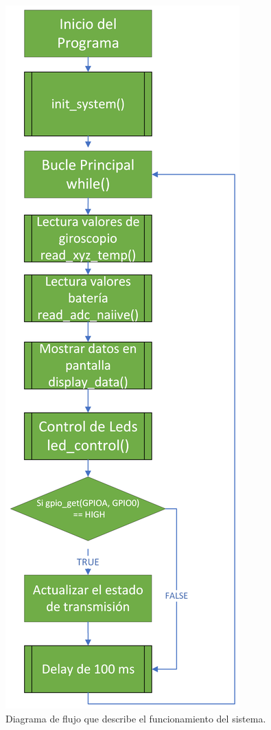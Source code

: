 \begin{figure}[H]
    \centering
        \includegraphics[scale = 0.58]{./Figuras/Desarrollo_Analisis/Diagrama_pendientes.png}
        \caption{Diagrama de flujo que describe el funcionamiento del sistema.}
    \end{figure}
\newpage

